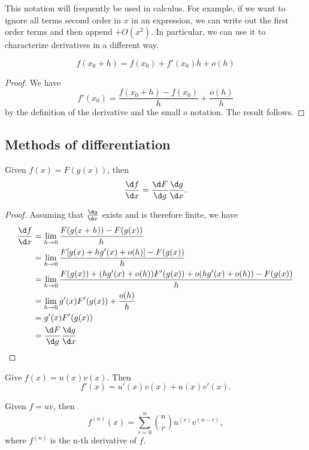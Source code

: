 \documentclass[a4paper]{article}
\begin{document}
{This notation will frequently be used in calculus. For example, if we want to ignore all terms second order in $x$ in an expression, we can write out the first order terms and then append $+O(x^2)$. In particular, we can use it to characterize derivatives in a different way.
\begin{prop}
  \[
    f(x_0 + h) = f(x_0) + f'(x_0)h + o(h)
  \]
\end{prop}

\begin{proof}
  We have
  \[
    f'(x_0) = \frac{f(x_0 + h) - f(x_0)}{h} + \frac{o(h)}{h}
  \]
  by the definition of the derivative and the small $o$ notation. The result follows.
\end{proof}

\subsection{Methods of differentiation}
\begin{thm}
  Given $f(x) = F(g(x))$, then
  \[
    \frac{\d f}{\d x} = \frac{\d F}{\d g}\frac{\d g}{\d x}.
  \]
\end{thm}

\begin{proof}
  Assuming that $\frac{\d g}{\d x}$ exists and is therefore finite, we have
  \begin{align*}
    \frac{\d f}{\d x} &= \lim_{h\to 0}\frac{F(g(x + h)) - F(g(x))}{h}\\
    &= \lim_{h\to 0}\frac{F[g(x) + hg'(x) + o(h)] - F(g(x))}{h}\\
    &= \lim_{h\to 0}\frac{F(g(x)) + (hg'(x) + o(h))F'(g(x)) + o(hg'(x) + o(h)) - F(g(x))}{h}\\
    &= \lim_{h\to 0}g'(x)F'(g(x)) + \frac{o(h)}{h}\\
    &= g'(x)F'(g(x))\\
    &= \frac{\d F}{\d g}\frac{\d g}{\d x}\qedhere
  \end{align*}
\end{proof}

\begin{thm}
  Give $f(x) = u(x)v(x)$. Then
  \[
    f'(x) = u'(x)v(x) + u(x)v'(x).
  \]
\end{thm}

\begin{thm}
  Given $f = uv$, then
  \[
    f^{(n)}(x) = \sum_{r = 0}^n \binom{n}{r}u^{(r)}v^{(n - r)},
  \]
  where $f^{(n)}$ is the n-th derivative of $f$.
\end{thm}

}
\end{document}
